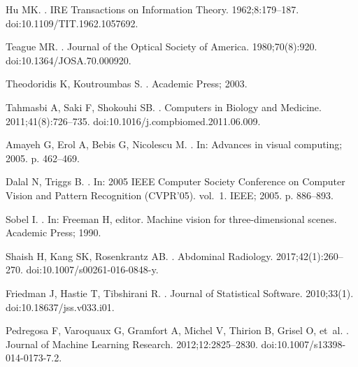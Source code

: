 \documentclass[10pt,letterpaper]{article}
\begin{document}
\begin{thebibliography}{10}
Hu MK.
.
\newblock IRE Transactions on Information Theory. 1962;8:179--187.
\newblock doi:{10.1109/TIT.1962.1057692}.

Teague MR.
.
\newblock Journal of the Optical Society of America. 1980;70(8):920.
\newblock doi:{10.1364/JOSA.70.000920}.

Theodoridis K, Koutroumbas S.
.
\newblock Academic Press; 2003.

Tahmasbi A, Saki F, Shokouhi SB.
.
\newblock Computers in Biology and Medicine. 2011;41(8):726--735.
\newblock doi:{10.1016/j.compbiomed.2011.06.009}.

Amayeh G, Erol A, Bebis G, Nicolescu M.
.
\newblock In: Advances in visual computing; 2005. p. 462--469.

Dalal N, Triggs B.
.
\newblock In: 2005 IEEE Computer Society Conference on Computer Vision and
  Pattern Recognition (CVPR'05). vol.~1. IEEE; 2005. p. 886--893.

Sobel I.
.
\newblock In: Freeman H, editor. Machine vision for three-dimensional scenes.
  Academic Press; 1990.

Shaish H, Kang SK, Rosenkrantz AB.
.
\newblock Abdominal Radiology. 2017;42(1):260--270.
\newblock doi:{10.1007/s00261-016-0848-y}.

Friedman J, Hastie T, Tibshirani R.
.
\newblock Journal of Statistical Software. 2010;33(1).
\newblock doi:{10.18637/jss.v033.i01}.

Pedregosa F, Varoquaux G, Gramfort A, Michel V, Thirion B, Grisel O, et~al.
.
\newblock Journal of Machine Learning Research. 2012;12:2825--2830.
\newblock doi:{10.1007/s13398-014-0173-7.2}.


\end{thebibliography}
\end{document}
